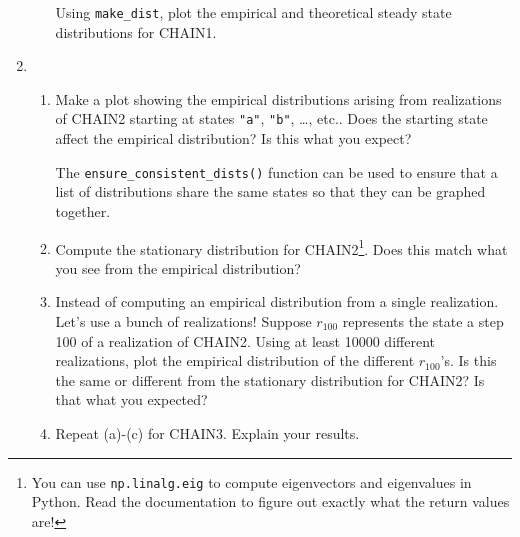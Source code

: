 \documentclass[letter]{article}
\begin{document}
\begin{enumerate}
\begin{enumerate}
				Using \verb|make_dist|, plot the empirical and theoretical steady state distributions for CHAIN1.
		\end{enumerate}

		\item
			\begin{enumerate}
				\item Make a plot showing the empirical distributions arising from realizations of CHAIN2 starting
					at states {\tt "a"}, {\tt "b"}, \ldots, etc.. Does the starting state affect the empirical
					distribution? Is this what you expect?

					The \verb|ensure_consistent_dists()| function can be used to ensure that a list of distributions
					share the same states so that they can be graphed together.
				\item Compute the stationary distribution for CHAIN2\footnote{ You can use {\tt np.linalg.eig}
					to compute eigenvectors and eigenvalues in Python. Read the documentation to figure out exactly
					what the return values are!}. Does this match what you see from the empirical distribution?
				\item Instead of computing an empirical distribution from a single realization. Let's use a bunch of realizations!
					Suppose $r_{100}$ represents the state a step 100 of a realization of CHAIN2. Using at least 10000
					different realizations, plot the empirical distribution of the different $r_{100}$'s. Is this the same
					or different from the stationary distribution for CHAIN2? Is that what you expected?
				\item Repeat (a)-(c) for CHAIN3. Explain your results.
			\end{enumerate}


\end{enumerate}
\end{document}
